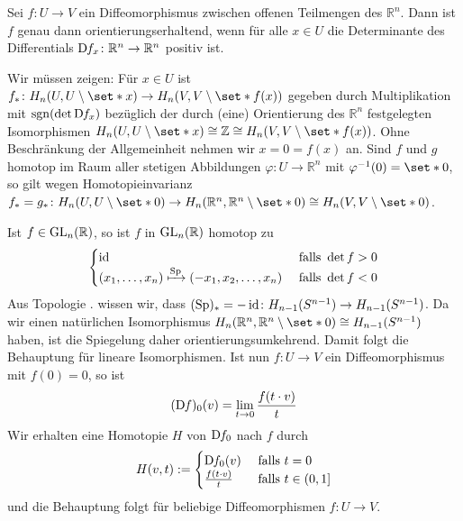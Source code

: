 \begin{lemma}[{name=[{Orientierungserhaltung von Diffeomorphismen}]}]
	Sei $f \colon U \to V$ ein Diffeomorphismus zwischen offenen Teilmengen des $\mathbb{R}^n$.
	Dann ist $f$ genau dann orientierungserhaltend, wenn für alle $x \in U$ die Determinante des Differentials $\mathrm{D}\mkern-1.0mu f_x \colon \mathbb{R}^n \to \mathbb{R}^n$ positiv ist.
\end{lemma}
\begin{beweis}
	Wir müssen zeigen: Für $x \in U$ ist $f_* \colon H_n \enbrace*{U,U\setminus \set*{x}} \to H_n \enbrace*{V,V \setminus \set*{f(x)}}$ gegeben durch Multiplikation mit $\sgn \enbrace*{\det \D f_x}$ bezüglich der durch (eine) Orientierung des $\mathbb{R}^n$ festgelegten Isomorphismen $H_n \enbrace*{U,U \setminus \set*{x}} \cong \mathbb{Z} \cong H_n \enbrace*{V,V\setminus \set*{f(x)}}$.
	Ohne Beschränkung der Allgemeinheit nehmen wir $x=0=f(x)$ an.
	Sind $f$ und $g$ homotop im Raum aller stetigen Abbildungen $\varphi \colon U \to \mathbb{R}^n$ mit $\varphi^{-1}(0)=\set*{0}$, so gilt wegen Homotopieinvarianz 
	$f_*=g_* \colon H_n \enbrace*{U,U \setminus \set*{0}} \to H_n \enbrace*{\mathbb{R}^n,\mathbb{R}^n\setminus \set*{0}} \cong H_n \enbrace*{V,V \setminus \set*{0}}$.
	
	Ist $f \in \operatorname{GL}_n(\mathbb{R})$, so ist $f$ in $\operatorname{GL}_n(\mathbb{R})$ homotop zu 
	\[
		\begin{cases}
			\operatorname{id} &\text{ falls }\det f >0\\
			(x_1,\ldots ,x_n) \xmapsto{\operatorname{Sp}} (-x_1,x_2,\ldots ,x_n) &\text{ falls } \det f < 0
		\end{cases}
	\]
	Aus Topologie . wissen wir, dass $(\operatorname{Sp})_* = - \operatorname{id} \colon H_{n-1}(S^{n-1}) \to H_{n-1}(S^{n-1})$.
	Da wir einen natürlichen Isomorphismus $H_n(\mathbb{R}^n,\mathbb{R}^n \setminus \set*{0}) \cong H_{n-1}(S^{n-1})$ haben, ist die Spiegelung daher orientierungsumkehrend.
	Damit folgt die Behauptung für lineare Isomorphismen.
	Ist nun $f \colon U \to V$ ein Diffeomorphismus mit $f(0)=0$, so ist 
	\[
		(\mathrm{D}\mkern-1.0mu f)_0 (v) = \lim_{t \to 0} \frac{f(t \cdot v)}{t} 
	\]
	Wir erhalten eine Homotopie $H$ von $\mathrm{D}\mkern-1.0mu f_0$ nach $f$ durch 
	\[
		H(v,t) := \begin{cases}
			\mathrm{D}\mkern-1.0mu f_0(v) &\text{ falls }t=0\\
			\frac{f(t \cdot v)}{t}  &\text{ falls } t \in (0,1]
		\end{cases}
	\]
	und die Behauptung folgt für beliebige Diffeomorphismen $f \colon U \to V$.
\end{beweis}

